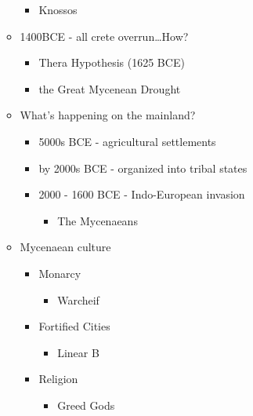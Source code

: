 \documentclass[11pt, a4paper]{article}
\begin{document}
\begin{itemize}
\begin{itemize}
\begin{itemize}
          \item Knossos
        \end{itemize}
      \item 1400BCE - all crete overrun\dots How?
        \begin{itemize}
          \item Thera Hypothesis (1625 BCE)
          \item the Great Mycenean Drought
        \end{itemize}
      \item What's happening on the mainland?
        \begin{itemize}
          \item 5000s BCE - agricultural settlements 
          \item by 2000s BCE - organized into tribal states
          \item 2000 - 1600 BCE - Indo-European invasion
            \begin{itemize}
              \item The Mycenaeans
            \end{itemize}
        \end{itemize}
      \item Mycenaean culture
        \begin{itemize}
          \item Monarcy
            \begin{itemize}
              \item Warcheif
            \end{itemize}
          \item Fortified Cities
            \begin{itemize}
              \item Linear B
              \end{itemize}
            \item Religion
              \begin{itemize}
                \item Greed Gods
              \end{itemize}
        \end{itemize}
    \end{itemize}
\end{itemize}
\end{document}
